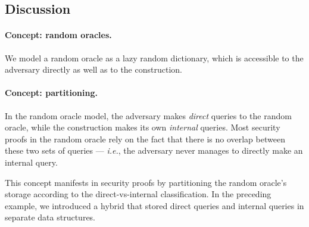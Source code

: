 \documentclass[11pt,letterpaper]{article}
\newcommand{\ie}{\textsl{i.e.}}
\newtheorem{claim}[theorem]{Claim}
\newcommand{\hybproof}[1]{}
\begin{document}
\subsection{Discussion}

\paragraph{Concept: random oracles.}
We model a random oracle as a lazy random dictionary, which is accessible to the adversary directly as well as to the construction.

\paragraph{Concept: partitioning.}
In the random oracle model, the adversary makes \emph{direct} queries to the random oracle, while the construction makes its own \emph{internal} queries.
Most security proofs in the random oracle rely on the fact that there is no overlap between these two sets of queries --- \ie, the adversary never manages to directly make an internal query.

This concept manifests in security proofs by partitioning the random oracle's storage according to the direct-vs-internal classification. 
In the preceding example, we introduced a hybrid that stored direct queries and internal queries in separate data structures.










%
%
\end{document}
